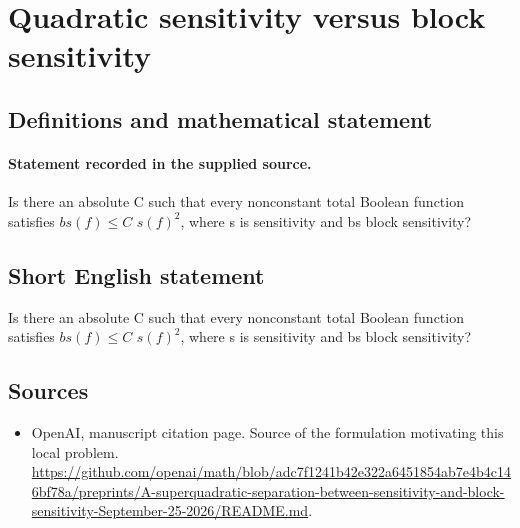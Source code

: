 \documentclass[11pt]{article}
\begin{document}
\section*{Quadratic sensitivity versus block sensitivity}\label{30007483}
\subsection{Definitions and mathematical statement}
\paragraph{Statement recorded in the supplied source.}
Is there an absolute C such that every nonconstant total Boolean function satisfies $bs(f)\leq C$ $s(f)^{2}$, where s is sensitivity and bs block sensitivity?
\subsection{Short English statement}
Is there an absolute C such that every nonconstant total Boolean function satisfies $bs(f)\leq C$ $s(f)^{2}$, where s is sensitivity and bs block sensitivity?
\subsection{Sources}
\begin{itemize}
\item[S1] OpenAI, manuscript citation page. Source of the formulation motivating this local problem.
\url{https://github.com/openai/math/blob/adc7f1241b42e322a6451854ab7e4b4c146bf78a/preprints/A-superquadratic-separation-between-sensitivity-and-block-sensitivity-September-25-2026/README.md}.
\end{itemize}
\end{document}
